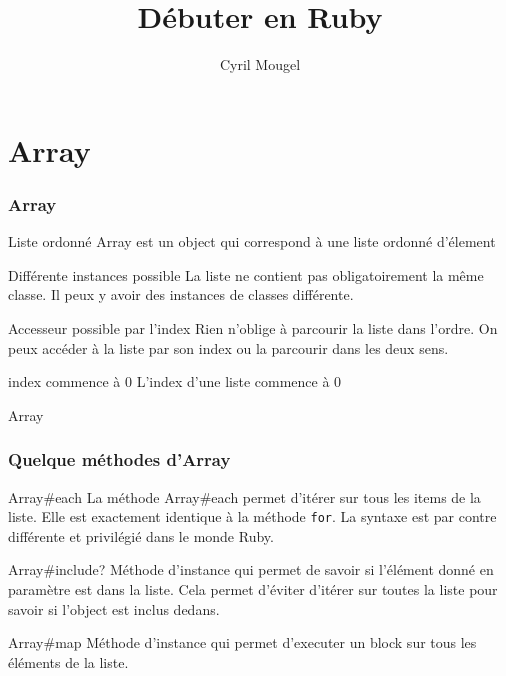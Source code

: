 \documentclass{beamer}
\title{D\'ebuter en Ruby}
\author{Cyril Mougel}
\begin{document}
\begin{frame}
  \titlepage
\end{frame}

\section{Array}

\begin{frame}
  \frametitle{Array}
  \begin{block}{Liste ordonn\'e}
    Array est un object qui correspond à une liste ordonn\'e d'\'element
  \end{block}
  \begin{block}{Diff\'erente instances possible}
    La liste ne contient pas obligatoirement la même classe. Il peux y avoir des instances de classes diff\'erente.
  \end{block}
  \begin{block}{Accesseur possible par l'index}
    Rien n'oblige à parcourir la liste dans l'ordre. On peux acc\'eder à la liste par son index ou la parcourir dans les deux sens.
  \end{block}
  \begin{block}{index commence à 0}
    L'index d'une liste commence à 0
  \end{block}
\end{frame}

\begin{frame}
  \begin{beamerboxesrounded}{Array}
    
  \end{beamerboxesrounded}
\end{frame}

\begin{frame}
  \frametitle{Quelque m\'ethodes d'Array}
  \begin{block}{Array\#each}
    La m\'ethode Array\#each permet d'it\'erer sur tous les items de la liste.
    Elle est exactement identique à la m\'ethode \verb?for?. La syntaxe est par contre diff\'erente et privil\'egi\'e dans le monde Ruby.
  \end{block}
  \begin{block}{Array\#include?}
    M\'ethode d'instance qui permet de savoir si l'\'el\'ement donn\'e en paramètre est dans la liste. Cela permet d'\'eviter d'it\'erer sur toutes
    la liste pour savoir si l'object est inclus dedans.
  \end{block}
  \begin{block}{Array\#map}
    M\'ethode d'instance qui permet d'executer un block sur tous les \'el\'ements de la liste.
  \end{block}
\end{frame}
\end{document}
